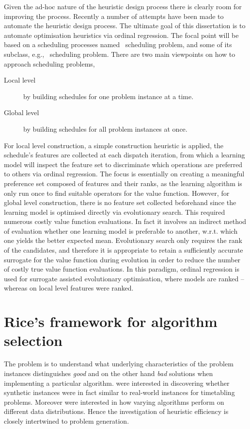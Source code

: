 Given the ad-hoc nature of the heuristic design process there is clearly room for improving the process. Recently a number of attempts have been made to automate the heuristic design process. 
The ultimate goal of this dissertation is to automate optimisation heuristics via ordinal regression. 
The focal point will be based on a scheduling processes named \jsp\ scheduling problem, and some of its subclass, e.g., \fsp\ scheduling problem.
There are two main viewpoints on how to approach scheduling problems,
\begin{description}
\item[Local level] by building schedules for one problem instance at a time.
\item[Global level] by building schedules for all problem instances at once.
\end{description}
For local level construction, a simple construction heuristic is applied, the schedule's features are collected at each dispatch iteration, from which a learning model will inspect the feature set to discriminate which operations are preferred to others via ordinal regression. The focus is essentially on creating a meaningful preference set composed of features and their ranks, as the learning algorithm is only run once to find suitable operators for the value function. 
However, for global level construction, there is no feature set collected beforehand since the learning model is optimised directly via evolutionary search. This required numerous costly value function evaluations. In fact it involves an indirect method of evaluation whether one learning model is preferable to another, w.r.t. which one yields the better expected mean. 
Evolutionary search only requires the rank of the candidates, and therefore it is appropriate to retain a sufficiently accurate surrogate for the value function during evolution in order to reduce the number of costly true value function evaluations. In this paradigm, ordinal regression is used for surrogate assisted evolutionary optimisation, where models are ranked -- whereas on local level features were ranked. 

\section{Rice's framework for algorithm selection}\label{sec:rice}
The problem is to understand what underlying characteristics of the problem instances distinguishes \emph{good} and on the other hand \emph{bad} solutions when implementing a particular algorithm. \citet{SmithMilesLion5} were interested in discovering whether synthetic instances were in fact similar to real-world instances for timetabling problems. Moreover \citeauthor{SmithMilesLion5} were interested in how varying algorithms perform on different data distributions. Hence the investigation of heuristic efficiency is closely intertwined to problem generation. 

